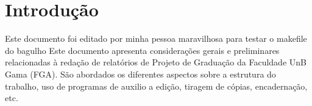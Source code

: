\chapter*[Introdução]{Introdução}

Este documento foi editado por minha pessoa maravilhosa para testar o makefile do bagulho
Este documento apresenta considerações gerais e preliminares relacionadas 
à redação de relatórios de Projeto de Graduação da Faculdade UnB Gama 
(FGA). São abordados os diferentes aspectos sobre a estrutura do trabalho, 
uso de programas de auxilio a edição, tiragem de cópias, encadernação, etc.

